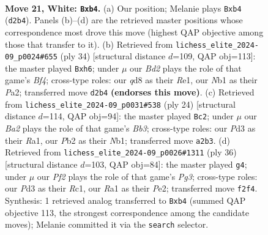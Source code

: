 \documentclass[11pt]{article}
\begin{document}
\clearpage

\begin{figure}[p]\centering
\begin{subfigure}{0.46\textwidth}\centering
\resizebox{\linewidth}{!}{%
\newchessgame
\chessboard[
  setfen={2bqnkr1/r3bp2/p2p2p1/n1p1p2p/Pp2P3/3PQ2N/BPPB1PPP/RN2R1K1 w - - 2 21},
  showmover=false,
  pgfstyle=straightmove, color=movearrow, markmove={d2-b4}
]}
\caption{}
\end{subfigure}\hfill
\begin{subfigure}{0.46\textwidth}\centering
\resizebox{\linewidth}{!}{%
\newchessgame
\chessboard[
  setfen={rn1qnrk1/1b3p2/pp1p1bpp/2pP4/2P1QB2/3B1NN1/PP3PPP/R3R1K1 w - - 0 18},
  showmover=false,
  pgfstyle=straightmove, color=movearrow, markmove={f4-h6}
]}
\caption{}
\end{subfigure}
\\[4pt]
\begin{subfigure}{0.46\textwidth}\centering
\resizebox{\linewidth}{!}{%
\newchessgame
\chessboard[
  setfen={r1bq1rk1/1p3pp1/n1pb3p/p3p3/P3P1n1/1BP2N2/1P3PPP/RNBQ1RK1 w - - 6 13},
  showmover=false,
  pgfstyle=straightmove, color=movearrow, markmove={b3-c2}
]}
\caption{}
\end{subfigure}\hfill
\begin{subfigure}{0.46\textwidth}\centering
\resizebox{\linewidth}{!}{%
\newchessgame
\chessboard[
  setfen={1r1n1r2/1bq1ppbk/p2p1npp/2p5/2P2B2/1PN2NPP/P2QPPB1/2RR2K1 w - - 1 19},
  showmover=false,
  pgfstyle=straightmove, color=movearrow, markmove={g3-g4}
]}
\caption{}
\end{subfigure}
\caption{\textbf{Move 21, White: \texttt{Bxb4}.} (a) Our position; Melanie plays \texttt{Bxb4} (\texttt{d2b4}). Panels (b)--(d) are the retrieved master positions whose correspondence most drove this move (highest QAP objective among those that transfer to it). (b) Retrieved from \texttt{lichess\_elite\_2024-09\_p0024\#655} (ply 34) [structural distance $d$=109, QAP obj=113]: the master played \texttt{Bxh6}; under $\mu$ our \emph{Bd2} plays the role of that game's \emph{Bf4}; cross-type roles: our \emph{q}d8 as their \emph{R}e1, our \emph{N}b1 as their \emph{P}a2; transferred move \texttt{d2b4} \textbf{(endorses this move)}. (c) Retrieved from \texttt{lichess\_elite\_2024-09\_p0031\#538} (ply 24) [structural distance $d$=114, QAP obj=94]: the master played \texttt{Bc2}; under $\mu$ our \emph{Ba2} plays the role of that game's \emph{Bb3}; cross-type roles: our \emph{P}d3 as their \emph{R}a1, our \emph{P}b2 as their \emph{N}b1; transferred move \texttt{a2b3}. (d) Retrieved from \texttt{lichess\_elite\_2024-09\_p0026\#1311} (ply 36) [structural distance $d$=103, QAP obj=84]: the master played \texttt{g4}; under $\mu$ our \emph{Pf2} plays the role of that game's \emph{Pg3}; cross-type roles: our \emph{P}d3 as their \emph{R}c1, our \emph{R}a1 as their \emph{P}e2; transferred move \texttt{f2f4}. Synthesis: 1 retrieved analog transferred to \texttt{Bxb4} (summed QAP objective 113, the strongest correspondence among the candidate moves); Melanie committed it via the \texttt{search} selector.}
\label{fig:thought-m40}
\end{figure}
\end{document}
